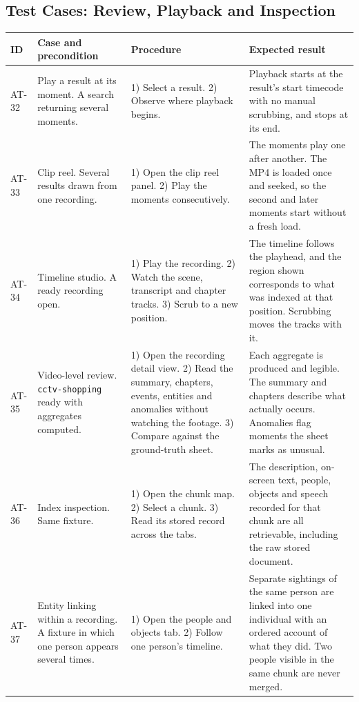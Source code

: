 \subsection{Test Cases: Review, Playback and Inspection}

\begin{table}[htbp]
\centering
\footnotesize
\begin{tabularx}{\textwidth}{@{}L{0.9cm}L{3.2cm}XX@{}}
\toprule
\textbf{ID} & \textbf{Case and precondition} & \textbf{Procedure} & \textbf{Expected result} \\
\midrule

AT-32 & Play a result at its moment. A search returning several moments. &
1) Select a result. 2) Observe where playback begins. &
Playback starts at the result's start timecode with no manual scrubbing, and stops at
its end. \\

AT-33 & Clip reel. Several results drawn from one recording. &
1) Open the clip reel panel. 2) Play the moments consecutively. &
The moments play one after another. The MP4 is loaded once and seeked, so the second
and later moments start without a fresh load. \\

AT-34 & Timeline studio. A ready recording open. &
1) Play the recording. 2) Watch the scene, transcript and chapter tracks. 3) Scrub to a
new position. &
The timeline follows the playhead, and the region shown corresponds to what was indexed
at that position. Scrubbing moves the tracks with it. \\

AT-35 & Video-level review. \texttt{cctv-shopping} ready with aggregates computed. &
1) Open the recording detail view. 2) Read the summary, chapters, events, entities and
anomalies without watching the footage. 3) Compare against the ground-truth sheet. &
Each aggregate is produced and legible. The summary and chapters describe what actually
occurs. Anomalies flag moments the sheet marks as unusual. \\

AT-36 & Index inspection. Same fixture. &
1) Open the chunk map. 2) Select a chunk. 3) Read its stored record across the tabs. &
The description, on-screen text, people, objects and speech recorded for that chunk are
all retrievable, including the raw stored document. \\

AT-37 & Entity linking within a recording. A fixture in which one person appears
several times. &
1) Open the people and objects tab. 2) Follow one person's timeline. &
Separate sightings of the same person are linked into one individual with an ordered
account of what they did. Two people visible in the same chunk are never merged. \\


\end{tabularx}
\end{table}
